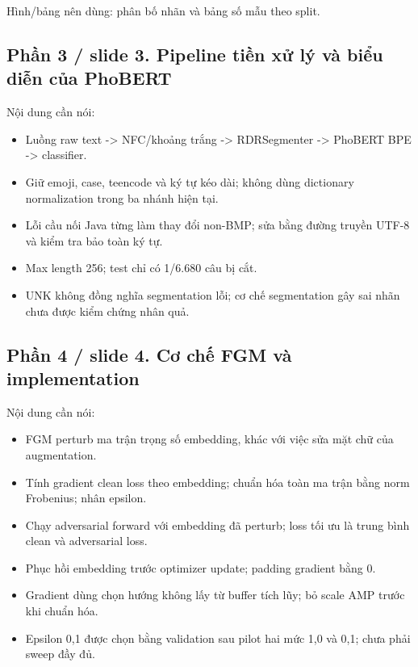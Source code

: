 \documentclass[11pt,a4paper]{article}
\begin{document}
Hình/bảng nên dùng: phân bố nhãn và bảng số mẫu theo split.


\subsection*{Phần 3 / slide 3. Pipeline tiền xử lý và biểu diễn của PhoBERT}

Nội dung cần nói:


\begin{itemize}

\item Luồng raw text -> NFC/khoảng trắng -> RDRSegmenter -> PhoBERT BPE -> classifier.

\item Giữ emoji, case, teencode và ký tự kéo dài; không dùng dictionary normalization trong ba nhánh hiện tại.

\item Lỗi cầu nối Java từng làm thay đổi non-BMP; sửa bằng đường truyền UTF-8 và kiểm tra bảo toàn ký tự.

\item Max length 256; test chỉ có 1/6.680 câu bị cắt.

\item UNK không đồng nghĩa segmentation lỗi; cơ chế segmentation gây sai nhãn chưa được kiểm chứng nhân quả.

\end{itemize}

\subsection*{Phần 4 / slide 4. Cơ chế FGM và implementation}

Nội dung cần nói:


\begin{itemize}

\item FGM perturb ma trận trọng số embedding, khác với việc sửa mặt chữ của augmentation.

\item Tính gradient clean loss theo embedding; chuẩn hóa toàn ma trận bằng norm Frobenius; nhân epsilon.

\item Chạy adversarial forward với embedding đã perturb; loss tối ưu là trung bình clean và adversarial loss.

\item Phục hồi embedding trước optimizer update; padding gradient bằng 0.

\item Gradient dùng chọn hướng không lấy từ buffer tích lũy; bỏ scale AMP trước khi chuẩn hóa.

\item Epsilon 0,1 được chọn bằng validation sau pilot hai mức 1,0 và 0,1; chưa phải sweep đầy đủ.

\end{itemize}
\end{document}

